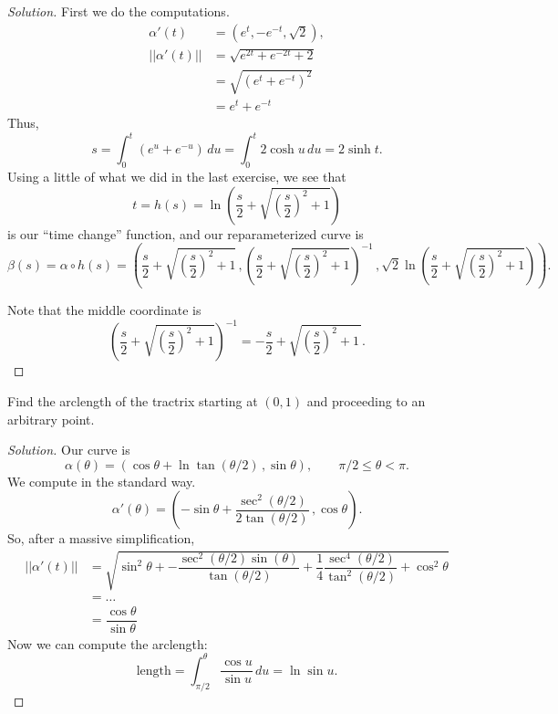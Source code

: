 \documentclass[Shifrin_Solutions_Spring_2015]{subfiles}
\begin{document}
\begin{proof}[Solution]
First we do the computations.
\begin{align*}
\alpha'(t) & = \left( e^t , -e^{-t} , \sqrt{2} \right) , \\
||\alpha'(t) || & =\sqrt{ e^{2t} + e^{-2t} + 2} \\
& = \sqrt{( e^t + e^{-t}  )^2} \\
& = e^t + e^{-t}
\end{align*}
Thus,
\[
s = \int_0^t (e^u + e^{-u} ) \, du = \int_0^t 2\cosh u \, du = 2 \sinh t.
\]
Using a little of what we did in the last exercise, we see that
\[
t = h(s) = \ln\left( \dfrac{s}{2} + \sqrt{\left(\dfrac{s}{2}\right)^2 + 1 } \right)
\]
is our ``time change'' function, and our reparameterized curve is
\[
\beta(s) = \alpha\circ h(s) = \left(
 \dfrac{s}{2} + \sqrt{\left(\dfrac{s}{2}\right)^2 + 1 } \, ,
\left( \dfrac{s}{2} + \sqrt{\left(\dfrac{s}{2}\right)^2 + 1 }\right)^{-1} \, ,
\sqrt{2}\ln\left(\dfrac{s}{2} + \sqrt{ \left(\dfrac{s}{2}\right)^2+1 } \right) \right) .
\]

Note that the middle coordinate is
\[
\left(\dfrac{s}{2} + \sqrt{\left(\dfrac{s}{2}\right)^2 + 1 }\right)^{-1} =  - \dfrac{s}{2} + \sqrt{\left(\dfrac{s}{2}\right)^2 + 1\, }  .
\]

\end{proof}

\vspace{.5cm}



\begin{exercise}
Find the arclength of the tractrix starting at $(0,1)$ and proceeding to an arbitrary point.
\end{exercise}

\begin{proof}[Solution]
Our curve is
\[
\alpha(\theta) = \left( \cos \theta + \ln \tan( \theta/2 )\, , \sin\theta \right) , \qquad \pi/2 \leq \theta < \pi .
\]
We compute in the standard way.
\[
\alpha'(\theta) = \left( -\sin\theta + \dfrac{\sec^2(\theta/2)}{2\tan(\theta/2)}\, , \cos\theta \right) .
\]
So, after a massive simplification,
\[
\begin{split}
||\alpha'(t) ||  & = \sqrt{  \sin^2\theta + -\dfrac{\sec^2(\theta/2)\sin(\theta)}{\tan(\theta/2)} + \dfrac{1}{4}\dfrac{\sec^4(\theta/2)}{\tan^2(\theta/2)} + \cos^2\theta   } \\
& = \ldots \\
& =   \dfrac{\cos \theta}{\sin\theta}
\end{split}
\]
Now we can compute the arclength:
\[
\text{length} = \int_{\pi/2}^{\theta} \dfrac{\cos u}{\sin u} \, du = \ln \sin u .
\]
\end{proof}
\end{document}
